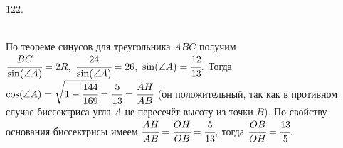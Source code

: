 122. \begin{figure}[ht!]
\end{figure}\\
По теореме синусов для треугольника $ABC$ получим $\cfrac{BC}{\sin(\angle A)}=2R,\ \cfrac{24}{\sin(\angle A)}=26,\ \sin(\angle A)=\cfrac{12}{13}.$
Тогда $\cos(\angle A)=\sqrt{1-\cfrac{144}{169}}=\cfrac{5}{13}=\cfrac{AH}{AB}$ (он положительный, так как в противном случае биссектриса угла $A$ не пересечёт высоту из точки $B$). По свойству основания биссектрисы имеем $\cfrac{AH}{AB}=\cfrac{OH}{OB}=\cfrac{5}{13},$ тогда $\cfrac{OB}{OH}=\cfrac{13}{5}.$\\
